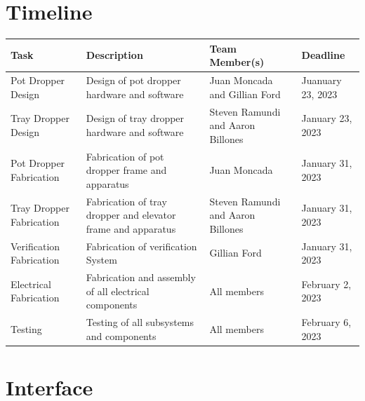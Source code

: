 \documentclass[12pt, titlepage]{article}
\begin{document}


\section{Timeline}


\begin{tabular}{ |p{3cm}|p{5cm}|p{4cm}|p{2cm}| }
  \hline
  Task & Description & Team Member(s) & Deadline\\
  \hline
  Pot Dropper Design & Design of pot dropper hardware and software
  & Juan Moncada and Gillian Ford & Juanuary 23, 2023\\
  \hline
  Tray Dropper Design & Design of tray dropper hardware and software
  & Steven Ramundi and Aaron Billones & January 23, 2023\\
  \hline
  Pot Dropper Fabrication & Fabrication of pot dropper frame and apparatus
  & Juan Moncada & January 31, 2023\\
  \hline
  Tray Dropper Fabrication & Fabrication of tray dropper and elevator frame and apparatus
  & Steven Ramundi and Aaron Billones & January 31, 2023\\
  \hline
  Verification Fabrication & Fabrication of verification System
  & Gillian Ford & January 31, 2023\\
  \hline
  Electrical Fabrication & Fabrication and assembly of all electrical components
  & All members & February 2, 2023\\
  \hline
  Testing & Testing of all subsystems and components
  & All members & February 6, 2023\\
  \hline

\end{tabular}

% 

\newpage{}

\appendix

\section{Interface}

\end{document}
